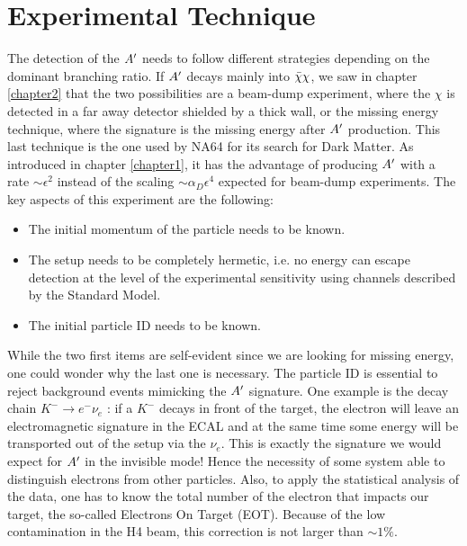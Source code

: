 \section{Experimental Technique}
\label{ch2:sec:experimental-technique}

The detection of the $A'$ needs to follow different strategies depending on the dominant branching ratio. If $A'$ decays mainly into $\bar{\chi} \chi$, we saw in chapter \ref{chapter2} that the two possibilities are a beam-dump experiment, where the $\chi$ is detected in a far away detector shielded by a thick wall, or the missing energy technique, where the signature is the missing energy after $A'$ production. This last technique is the one used by NA64 for its search for Dark Matter. As introduced in chapter \ref{chapter1}, it has the advantage of producing $A'$ with a rate $\sim \epsilon^2$ instead of the scaling $\sim \alpha_D \epsilon^4$ expected for beam-dump experiments. The key aspects of this experiment are the following:

\begin{itemize}
\item The initial momentum of the particle needs to be known.
\item The setup needs to be completely hermetic, i.e. no energy can escape detection at the level of the experimental sensitivity using channels described by the Standard Model.
\item The initial particle ID needs to be known.
\end{itemize}

While the two first items are self-evident since we are looking for missing energy, one could wonder why the last one is necessary. The particle ID is essential to reject background events mimicking the $A'$ signature. One example is the decay chain $K^- \to e^- \nu_e$ \cite{review-particle-physics}: if a $K^-$ decays in front of the target, the electron will leave an electromagnetic signature in the ECAL and at the same time some energy will be transported out of the setup via the $\nu_e$. This is exactly the signature we would expect for $A'$ in the invisible mode! Hence the necessity of some system able to distinguish electrons from other particles. Also,  to apply the statistical analysis of the data, one has to know the total number of the electron that impacts our target, the so-called Electrons On Target (EOT). Because of the low contamination in the H4 beam, this correction is not larger than $\sim1\%$.

